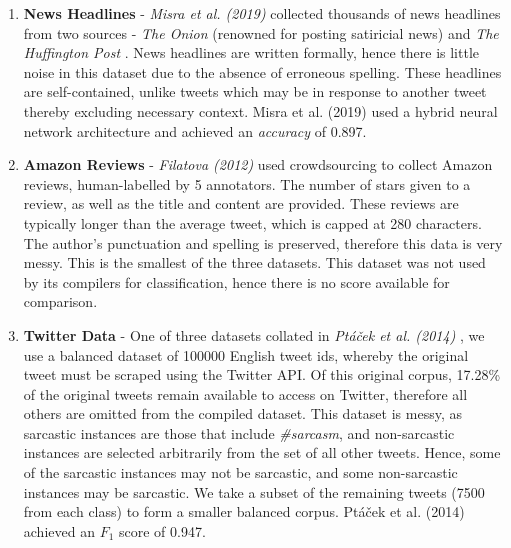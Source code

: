 \documentclass[12pt,a4paper]{article}
\begin{document}
\begin{enumerate}[leftmargin=0cm]
	\item \textbf{News Headlines} - \textit{Misra et al. (2019)} \cite{misra2019sarcasm} collected thousands of news headlines from two sources - \textit{The Onion} \footnotemark[3] (renowned for posting satiricial news) and \textit{The Huffington Post} \footnotemark[4]. News headlines are written formally, hence there is little noise in this dataset due to the absence of erroneous spelling. These headlines are self-contained, unlike tweets which may be in response to another tweet thereby excluding necessary context. Misra et al. (2019) \cite{misra2019sarcasm} used a hybrid neural network architecture and achieved an \textit{accuracy} of 0.897.
	
	\item \textbf{Amazon Reviews} - \textit{Filatova (2012)} \cite{filatova2012irony} used crowdsourcing to collect Amazon reviews, human-labelled by 5 annotators. The number of stars given to a review, as well as the title and content are provided. These reviews are typically longer than the average tweet, which is capped at 280 characters. The author's punctuation and spelling is preserved, therefore this data is very messy. This is the smallest of the three datasets. This dataset was not used by its compilers for classification, hence there is no score available for comparison.
	
	\item \textbf{Twitter Data} - One of three datasets collated in \textit{Pt\'a\v{c}ek et al. (2014)} \cite{ptavcek2014sarcasm}, we use a balanced dataset of 100000 English tweet ids, whereby the original tweet must be scraped using the Twitter API. Of this original corpus, 17.28\% of the original tweets remain available to access on Twitter, therefore all others are omitted from the compiled dataset. This dataset is messy, as sarcastic instances are those that include \textit{\#sarcasm}, and non-sarcastic instances are selected arbitrarily from the set of all other tweets. Hence, some of the sarcastic instances may not be sarcastic, and some non-sarcastic instances may be sarcastic. We take a subset of the remaining tweets (7500 from each class) to form a smaller balanced corpus. Pt\'a\v{c}ek et al. (2014) \cite{ptavcek2014sarcasm} achieved an $F_{1}$ score of 0.947.
\end{enumerate}

\end{document}
